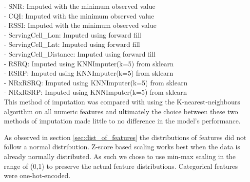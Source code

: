 - SNR: Imputed with the minimum observed value \\
- CQI: Imputed with the minimum observed value \\
- RSSI: Imputed with the minimum observed value \\
- ServingCell\_Lon: Imputed using forward fill \\
- ServingCell\_Lat: Imputed using forward fill \\
- ServingCell\_Distance: Imputed using forward fill \\
- RSRQ: Imputed using KNNImputer(k=5) from sklearn \\
- RSRP: Imputed using KNNImputer(k=5) from sklearn \\
- NRxRSRQ: Imputed using KNNImputer(k=5) from sklearn \\
- NRxRSRP: Imputed using KNNImputer(k=5) from sklearn \\


This method of imputation was compared with using the K-nearest-neighbours algorithm on all numeric features and ultimately the choice between these two methods of imputation made little to no difference in the model's performance.

As observed in section \ref{sec:dist_of_features} the distributions of features did not follow a normal distribution. Z-score based scaling works best when the data is already normally distributed. As such we chose to use min-max scaling in the range of (0,1) to preserve the actual feature distributions. Categorical features were one-hot-encoded.